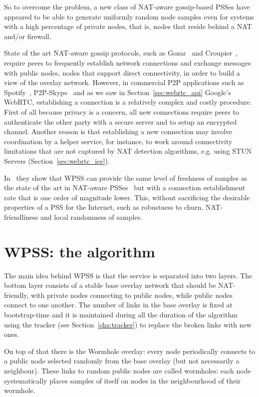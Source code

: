 So to overcome the problem, a new class of NAT-aware gossip-based PSSes have appeared to be able to generate uniformly random node samples even for systems with a high percentage of private nodes, that is, nodes that reside behind a NAT and/or firewall.

State of the art NAT-aware gossip protocols, such as Gozar~\cite{gozar} and Croupier~\cite{croupier}, require peers to frequently establish network connections and exchange messages with public nodes, nodes that support direct connectivity, in order to build a view of the overlay network. However, in commercial P2P applications such as Spotify~\cite{spotify}, P2P-Skype~\cite{skype} and as we saw in Section~\ref{sec:webrtc_api} Google’s WebRTC, establishing a connection is a relatively complex and costly procedure. First of all because privacy is a concern, all new connections require peers to authenticate the other party with a secure server and to setup an encrypted channel. Another reason is that establishing a new connection may involve coordination by a helper service, for instance, to work around connectivity limitations that are not captured by NAT detection algorithms, e.g. using STUN Servers (Section~\ref{sec:webrtc_ice}). 

In~\cite{wormhole} they show that \ac{WPSS} can provide the same level of freshness of samples as the state of the art in NAT-aware PSSes~\cite{croupier} but with a connection establishment rate that is one order of magnitude lower. This, without sacrificing the desirable properties of a PSS for the Internet, such as robustness to churn, NAT-friendliness and local randomness of samples.

\section{WPSS: the algorithm}
\label{sec:wpss_algorithm}
The main idea behind \ac{WPSS} is that the service is separated into two layers. The bottom layer consists of a stable base overlay network that should be NAT-friendly, with private nodes connecting to public nodes, while public nodes connect to one another. The number of links in the base overlay is fixed at bootstrap-time and it is maintained during all the duration of the algorithm using the tracker (see Section~\ref{cha:tracker}) to replace the broken links with new ones.

On top of that there is the Wormhole overlay: every node periodically connects to a public node selected randomly from the base overlay (but not necessarily a neighbour). These links to random public nodes are called wormholes: each node systematically places samples of itself on nodes in the neighbourhood of their wormhole. 

